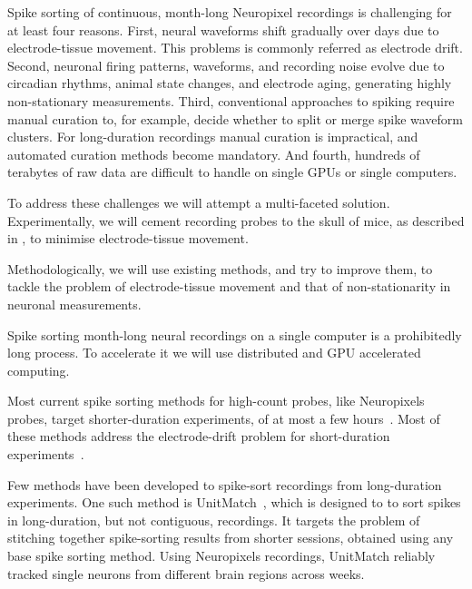 
Spike sorting of continuous, month-long Neuropixel recordings is challenging
for at least four reasons.
%
First, neural waveforms shift gradually over days due to electrode-tissue
movement. This problems is commonly referred as electrode drift.
%
Second, neuronal firing patterns, waveforms, and recording noise evolve due to
circadian rhythms, animal state changes, and electrode aging, generating highly
non-stationary measurements.
%
Third, conventional approaches to spiking require manual curation to, for
example, decide whether to split or merge spike waveform clusters. For
long-duration recordings manual curation is impractical, and automated
curation methods become mandatory.
%
And fourth, hundreds of terabytes of raw data are difficult to handle on single
GPUs or single computers.


To address these challenges we will attempt a multi-faceted solution.
%
Experimentally, we will cement recording probes to the skull of mice, as
described in \citep[][supplementary discussion]{schnoonoverEtAl21}, to minimise
electrode-tissue movement.

Methodologically, we will use existing methods, and try to improve them, to
tackle the problem of electrode-tissue movement and that of non-stationarity in
neuronal measurements.

Spike sorting month-long neural recordings on a single computer is a
prohibitedly long process. To accelerate it we will use distributed and GPU
accelerated computing.


Most current spike sorting methods for high-count probes, like Neuropixels
probes, target shorter-duration experiments, of at most a few
hours~\citep[e.g.,][]{pachitariuEtAl24}.
%
Most of these methods address the electrode-drift
problem for short-duration experiments~\citep{steinmetzEtAl21}.

Few methods have been developed to spike-sort recordings from long-duration
experiments.
%
One such method is UnitMatch~\citep{vanBeestEtAl24}, which is designed to to
sort spikes in long-duration, but not contiguous, recordings.
%
It targets the problem of stitching together spike-sorting results from shorter
sessions, obtained using any base spike sorting method.
%
Using Neuropixels recordings, UnitMatch reliably tracked single neurons from
different brain regions across weeks.

